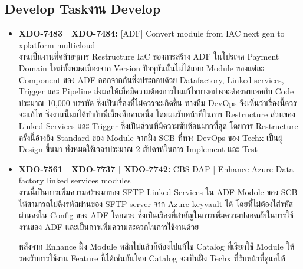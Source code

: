 \subsection{\ifenglish Develop Task\else งาน Develop\fi}
\begin{itemize}
      \item \textbf{XDO-7483 | XDO-7484:} [ADF] Convert module from IAC next gen to xplatform multicloud\\
            งานเป็นงานที่คล้ายๆการ Restructure IaC ของการสร้าง ADF ในโปรเจค Payment Domain ใหม่ทั้งหมดเนื่องจาก Version ปัจจุบันนั้นไม่ได้แยก Module ของแต่ละ Component ของ ADF ออกจากกันซึ่งประกอบด้วย Datafactory, Linked services, Trigger และ Pipeline ส่งผลให้เมื่อมีความต้องการในแก้ไขบางอย่างจะต้องพบเจอกับ Code ประมาณ 10,000 บรรทัด ซึ่งเป็นเรื่องที่ไม่ควรจะเกิดขึ้น ทางทีม DevOps จึงเห็นว่าเรื่องนี้ควรจะแก้ไข ซึ่งงานนี้ผมได้ทำกับพี่เลี้ยงอีกคนหนึ่ง โดยผมรับหน้าที่ในการ Restructure ส่วนของ Linked Services และ Trigger ซึ่งเป็นส่วนที่มีความซับซ้อนมากที่สุด โดยการ Restructure ครั้งนี้อ้างอิง Standard ของ Module จากฝั่ง SCB ที่ทาง DevOps ของ Techx เป็นผู้ Design ขึ้นมา ทั้งหมดใช้เวลาประมาณ 2 สัปดาห์ในการ Implement และ Test
      \item \textbf{XDO-7561 | XDO-7737 | XDO-7742:} CBS-DAP | Enhance Azure Data factory linked services modules\\
            งานนี้เป็นการเพิ่มความสร้างมาของ SFTP Linked Services ใน ADF Modole ของ SCB ให้สามารถไปดึงรหัสผ่านของ SFTP server จาก Azure keyvault ได้ โดยที่ไม่ต้องใส่รหัสผ่านลงใน Config ของ ADF โดยตรง ซึ่งเป็นเรื่องที่สำคัญในการเพิ่มความปลอดภัยในการใช้งานของ ADF และเป็นการเพิ่มความสะดวกในการใช้งานด้วย

            หลังจาก Enhance ฝั่ง Module หลักไปแล้วก็ต้องไปแก้ไข Catalog ที่เรียกใช้ Module ให้รองรับการใช้งาน Feature นี้ได้เช่นกันโดย Catalog จะเป็นฝั่ง Techx ที่รับหน้าที่ดูแลให้


\end{itemize}
